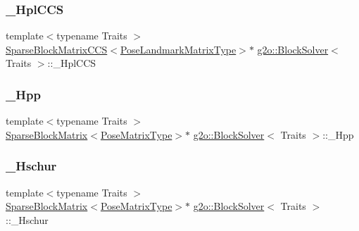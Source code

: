 \mbox{\label{classg2o_1_1_block_solver_ab54eb7bb13f8b3a8a5f135a98f2050ec}} 
\subsubsection{\texorpdfstring{\+\_\+\+Hpl\+C\+CS}{\_HplCCS}}
{\footnotesize\ttfamily template$<$typename Traits $>$ \\
\mbox{\hyperlink{classg2o_1_1_sparse_block_matrix_c_c_s}{Sparse\+Block\+Matrix\+C\+CS}}$<$\mbox{\hyperlink{classg2o_1_1_block_solver_a96bf60b923f816086cd2f24de38736ec}{Pose\+Landmark\+Matrix\+Type}}$>$$\ast$ \mbox{\hyperlink{classg2o_1_1_block_solver}{g2o\+::\+Block\+Solver}}$<$ Traits $>$\+::\+\_\+\+Hpl\+C\+CS\hspace{0.3cm}{\ttfamily [protected]}}

\mbox{\label{classg2o_1_1_block_solver_ac222d4342825ed8632a87b4f5be94618}} 
\subsubsection{\texorpdfstring{\+\_\+\+Hpp}{\_Hpp}}
{\footnotesize\ttfamily template$<$typename Traits $>$ \\
\mbox{\hyperlink{classg2o_1_1_sparse_block_matrix}{Sparse\+Block\+Matrix}}$<$\mbox{\hyperlink{classg2o_1_1_block_solver_a8c7c43d361bd31e3e0353889ba703bc0}{Pose\+Matrix\+Type}}$>$$\ast$ \mbox{\hyperlink{classg2o_1_1_block_solver}{g2o\+::\+Block\+Solver}}$<$ Traits $>$\+::\+\_\+\+Hpp\hspace{0.3cm}{\ttfamily [protected]}}

\mbox{\label{classg2o_1_1_block_solver_a46977934a3e4fb0cd36bc4181ed3ec0e}} 
\subsubsection{\texorpdfstring{\+\_\+\+Hschur}{\_Hschur}}
{\footnotesize\ttfamily template$<$typename Traits $>$ \\
\mbox{\hyperlink{classg2o_1_1_sparse_block_matrix}{Sparse\+Block\+Matrix}}$<$\mbox{\hyperlink{classg2o_1_1_block_solver_a8c7c43d361bd31e3e0353889ba703bc0}{Pose\+Matrix\+Type}}$>$$\ast$ \mbox{\hyperlink{classg2o_1_1_block_solver}{g2o\+::\+Block\+Solver}}$<$ Traits $>$\+::\+\_\+\+Hschur\hspace{0.3cm}{\ttfamily [protected]}}

